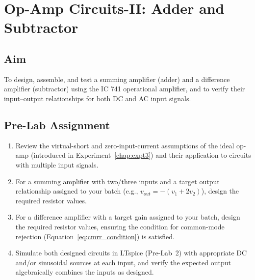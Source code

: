 %

\chapter{Op-Amp Circuits-II: Adder and Subtractor}
\label{chap:expt4}

\section{Aim}
To design, assemble, and test a summing amplifier (adder) and a difference amplifier (subtractor) using the IC 741 operational amplifier, and to verify their input--output relationships for both DC and AC input signals.

\section{Pre-Lab Assignment}
\begin{enumerate}[label=(\roman*)]
	\item Review the virtual-short and zero-input-current assumptions of the ideal op-amp (introduced in Experiment~\ref{chap:expt3}) and their application to circuits with multiple input signals.
	\item For a summing amplifier with two/three inputs and a target output relationship assigned to your batch (e.g., $v_{out} = -(v_1 + 2v_2)$), design the required resistor values.
	\item For a difference amplifier with a target gain assigned to your batch, design the required resistor values, ensuring the condition for common-mode rejection (Equation~\eqref{eq:cmrr_condition}) is satisfied.
	\item Simulate both designed circuits in LTspice (Pre-Lab~2) with appropriate DC and/or sinusoidal sources at each input, and verify the expected output algebraically combines the inputs as designed.
\end{enumerate}

